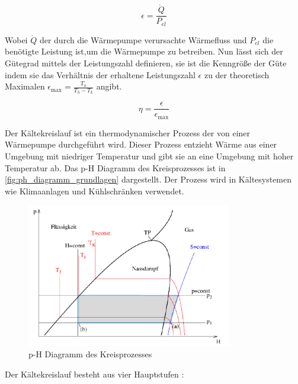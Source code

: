 \documentclass[12pt,english,ngerman]{scrartcl}
\begin{document}
\begin{equation}
	\epsilon = \frac{\dot{Q}}{P_{el}}
	\label{eq:Leistungszahl}
\end{equation}

Wobei $\dot{Q}$ der durch die Wärmepumpe verursachte Wärmefluss und
$P_{el}$ die benötigte Leistung ist,um die Wärmepumpe zu betreiben. Nun lässt sich
der Gütegrad mittels der Leistungszahl definieren, sie ist die Kenngröße der
Güte indem sie das Verhältnis der erhaltene Leistungszahl $\epsilon$ zu der
theoretisch Maximalen $\epsilon_\text{max} = \frac{T_h}{T_h-T_k}$ angibt.

\begin{equation}
	\eta = \frac{\epsilon}{\epsilon_\text{max}}
	\label{eq:guetefaktor}
\end{equation}

Der Kältekreislauf ist ein thermodynamischer Prozess der von einer Wärmepumpe
durchgeführt wird. Dieser Prozess entzieht Wärme aus einer Umgebung mit
niedriger Temperatur und gibt sie an eine Umgebung mit hoher Temperatur ab.
Das p-H Diagramm des Kreisprozesses ist in \autoref{fig:ph_diagramm_grundlagen} dargestellt. Der
Prozess wird in Kältesystemen wie Klimaanlagen und Kühlschränken verwendet.

\begin{figure}[H]
	\begin{center}
		\includegraphics[width =0.8\textwidth]{./figures/ph_diagramm_grundlagen.PNG}
	\end{center}
	\caption[p-H Diagramm des Kreisprozesses]{p-H Diagramm des Kreisprozesses \cite{unterlagen_warmepumpe}
	}\label{fig:ph_diagramm_grundlagen}
\end{figure}

Der Kältekreislauf besteht aus vier Hauptstufen \cite{unterlagen_warmepumpe}:
\end{document}
